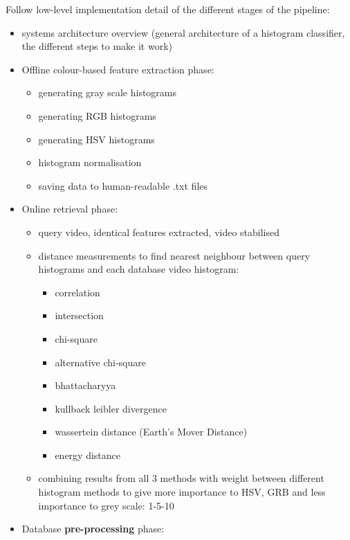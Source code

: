 Follow low-level implementation detail of the different stages of the pipeline:
\begin{itemize}
    \item systems architecture overview (general architecture of a histogram classifier, the different steps to make it work)
    \item Offline colour-based feature extraction phase:
        \begin{itemize}
            \item generating gray scale histograms
            \item generating RGB histograms
            \item generating HSV histograms
            \item histogram normalisation
            \item saving data to human-readable .txt files
        \end{itemize}
    \item Online retrieval phase:
        \begin{itemize}
            \item query video, identical features extracted, video stabilised
            \item distance measurements to find nearest neighbour between query histograms and each database video histogram:
                \begin{itemize}
                    \item correlation
                    \item intersection
                    \item chi-square
                    \item alternative chi-square
                    \item bhattacharyya
                    \item kullback leibler divergence
                    \item wassertein distance (Earth's Mover Distance)
                    \item energy distance
                \end{itemize}
            \item combining results from all 3 methods with weight between different histogram methods to give more importance to HSV, GRB and less importance to grey scale: 1-5-10
        \end{itemize}
    \item Database \textbf{pre-processing} phase:
        \begin{itemize}

\end{itemize}
\end{itemize}
